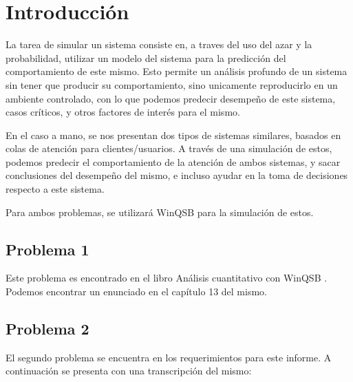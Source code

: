 \section{Introducción}
La tarea de simular un sistema consiste en, a traves del uso del azar y la probabilidad, utilizar un modelo del sistema para la predicción del comportamiento de este mismo. Esto permite un análisis profundo de un sistema sin tener que producir su comportamiento, sino unicamente reproducirlo en un ambiente controlado, con lo que podemos predecir desempeño de este sistema, casos críticos, y otros factores de interés para el mismo.

En el caso a mano, se nos presentan dos tipos de sistemas similares, basados en colas de atención para clientes/usuarios. A través de una simulación de estos, podemos predecir el comportamiento de la atención de ambos sistemas, y sacar conclusiones del desempeño del mismo, e incluso ayudar en la toma de decisiones respecto a este sistema.

Para ambos problemas, se utilizará WinQSB para la simulación de estos.

\subsection{Problema 1}
Este problema es encontrado en el libro Análisis cuantitativo con WinQSB \cite{acwinqsb}. Podemos encontrar un enunciado en el capítulo 13 del mismo.


\subsection{Problema 2}
El segundo problema se encuentra en los requerimientos para este informe. A continuación se presenta con una transcripción del mismo: \\

